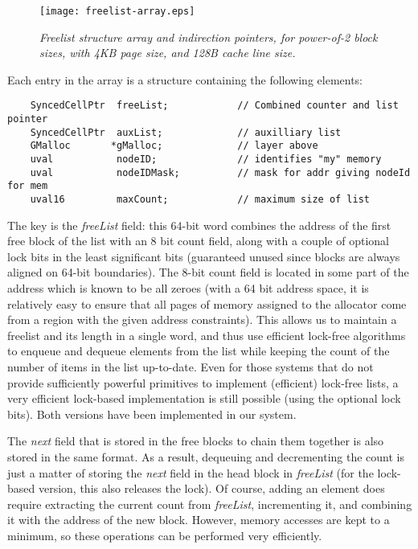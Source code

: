 \documentclass[dvips,11pt]{article}
\begin{document}
\begin{figure}[t]
  \centerline{
    \texttt{[image: freelist-array.eps]}
    }
  \caption{\small\emph{Freelist structure array and indirection pointers,
      for power-of-2 block sizes, with 4KB page size, and 128B cache line
      size.}}
  \label{freelist-array:fig}
\end{figure}


Each entry in the array is a structure containing the following elements:
{\footnotesize
\begin{verbatim}
    SyncedCellPtr  freeList;            // Combined counter and list pointer
    SyncedCellPtr  auxList;             // auxilliary list
    GMalloc       *gMalloc;             // layer above
    uval           nodeID;              // identifies "my" memory
    uval           nodeIDMask;          // mask for addr giving nodeId for mem
    uval16         maxCount;            // maximum size of list
\end{verbatim}
} 

The key is the \emph{freeList} field: this 64-bit word combines the address
of the first free block of the list with an 8 bit count field, along with a
couple of optional lock bits in the least significant bits (guaranteed
unused since blocks are always aligned on 64-bit boundaries).  The 8-bit
count field is located in some part of the address which is known to be all
zeroes (with a 64 bit address space, it is relatively easy to ensure that
all pages of memory assigned to the allocator come from a region with the
given address constraints).  This allows us to maintain a freelist and its
length in a single word, and thus use efficient lock-free algorithms to
enqueue and dequeue elements from the list while keeping the count of the
number of items in the list up-to-date.  Even for those systems that do not
provide sufficiently powerful primitives to implement (efficient) lock-free
lists, a very efficient lock-based implementation is still possible (using
the optional lock bits).  Both versions have been implemented in our
system.

The \emph{next} field that is stored in the free blocks to chain them
together is also stored in the same format.  As a result, dequeuing and
decrementing the count is just a matter of storing the \emph{next} field in
the head block in \emph{freeList} (for the lock-based version, this also
releases the lock).  Of course, adding an element does require extracting
the current count from \emph{freeList}, incrementing it, and combining it
with the address of the new block.  However, memory accesses are kept to a
minimum, so these operations can be performed very efficiently.
\end{document}
